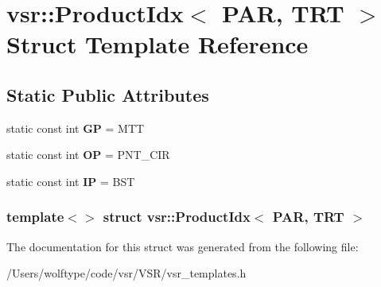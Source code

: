 \hypertarget{structvsr_1_1_product_idx_3_01_p_a_r_00_01_t_r_t_01_4}{\section{vsr\-:\-:Product\-Idx$<$ P\-A\-R, T\-R\-T $>$ Struct Template Reference}
\label{structvsr_1_1_product_idx_3_01_p_a_r_00_01_t_r_t_01_4}
}
\subsection*{Static Public Attributes}
\begin{DoxyCompactItemize}
\item 
\hypertarget{structvsr_1_1_product_idx_3_01_p_a_r_00_01_t_r_t_01_4_a981ea0bb03074c6a7d4ab87d6e2128db}{static const int {\bfseries G\-P} = M\-T\-T}\label{structvsr_1_1_product_idx_3_01_p_a_r_00_01_t_r_t_01_4_a981ea0bb03074c6a7d4ab87d6e2128db}

\item 
\hypertarget{structvsr_1_1_product_idx_3_01_p_a_r_00_01_t_r_t_01_4_aac1854611d778ec86616db85db75de12}{static const int {\bfseries O\-P} = P\-N\-T\-\_\-\-C\-I\-R}\label{structvsr_1_1_product_idx_3_01_p_a_r_00_01_t_r_t_01_4_aac1854611d778ec86616db85db75de12}

\item 
\hypertarget{structvsr_1_1_product_idx_3_01_p_a_r_00_01_t_r_t_01_4_a2a3e29cea42c2dd2c496628aaa0df484}{static const int {\bfseries I\-P} = B\-S\-T}\label{structvsr_1_1_product_idx_3_01_p_a_r_00_01_t_r_t_01_4_a2a3e29cea42c2dd2c496628aaa0df484}

\end{DoxyCompactItemize}
\subsubsection*{template$<$$>$ struct vsr\-::\-Product\-Idx$<$ P\-A\-R, T\-R\-T $>$}



The documentation for this struct was generated from the following file\-:\begin{DoxyCompactItemize}
\item 
/\-Users/wolftype/code/vsr/\-V\-S\-R/vsr\-\_\-templates.\-h\end{DoxyCompactItemize}

